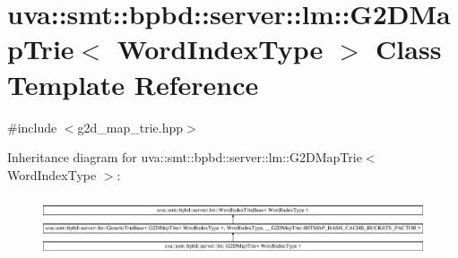 \hypertarget{classuva_1_1smt_1_1bpbd_1_1server_1_1lm_1_1_g2_d_map_trie}{}\section{uva\+:\+:smt\+:\+:bpbd\+:\+:server\+:\+:lm\+:\+:G2\+D\+Map\+Trie$<$ Word\+Index\+Type $>$ Class Template Reference}
\label{classuva_1_1smt_1_1bpbd_1_1server_1_1lm_1_1_g2_d_map_trie}


{\ttfamily \#include $<$g2d\+\_\+map\+\_\+trie.\+hpp$>$}

Inheritance diagram for uva\+:\+:smt\+:\+:bpbd\+:\+:server\+:\+:lm\+:\+:G2\+D\+Map\+Trie$<$ Word\+Index\+Type $>$\+:\begin{figure}[H]
\begin{center}
\leavevmode
\includegraphics[height=1.812298cm]{classuva_1_1smt_1_1bpbd_1_1server_1_1lm_1_1_g2_d_map_trie}
\end{center}
\end{figure}
